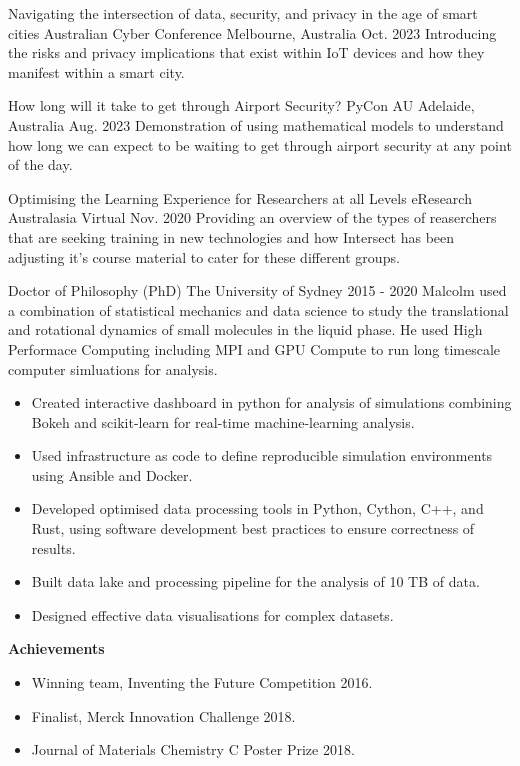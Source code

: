 
\begin{cventry}
  {Navigating the intersection of data, security, and privacy in the age of smart cities}
  {Australian Cyber Conference}
  {Melbourne, Australia}
  {Oct. 2023}
  {Introducing the risks and privacy implications that exist within IoT devices
  and how they manifest within a smart city.}
\end{cventry}

\begin{cventry}
  {How long will it take to get through Airport Security?}
  {PyCon AU}
  {Adelaide, Australia}
  {Aug. 2023}
  {Demonstration of using mathematical models to understand how long we can expect to be waiting
  to get through airport security at any point of the day.}
\end{cventry}

\begin{cventry}
  {Optimising the Learning Experience for Researchers at all Levels}
  {eResearch Australasia}
  {Virtual}
  {Nov. 2020}
  {Providing an overview of the types of reaserchers that are seeking training in new technologies
  and how Intersect has been adjusting it's course material to cater for these different groups.}
\end{cventry}


\begin{cventry}
  {Doctor of Philosophy (PhD)} %
  {The University of Sydney} %
  {} %
  {2015 - 2020} %
  Malcolm used a combination of statistical mechanics and data science to
  study the translational and rotational dynamics
  of small molecules in the liquid phase.
  He used High Performace Computing
  including MPI and GPU Compute
  to run long timescale computer simluations for analysis.
  \begin{itemize}
    \item Created interactive dashboard in python for analysis of simulations
      combining Bokeh and scikit-learn for real-time machine-learning analysis.
    \item Used infrastructure as code to define reproducible simulation environments
      using Ansible and Docker.
    \item Developed optimised data processing tools in Python, Cython, C++, and Rust,
      using software development best practices to ensure correctness of results.
    \item Built data lake and processing pipeline for the analysis of 10 TB of data.
    \item Designed effective data visualisations for complex datasets.
  \end{itemize}
  \textbf{Achievements}
  \begin{itemize}
    \item Winning team, Inventing the Future Competition 2016.
    \item Finalist, Merck Innovation Challenge 2018.
    \item Journal of Materials Chemistry C Poster Prize 2018.
  \end{itemize}
\end{cventry}

